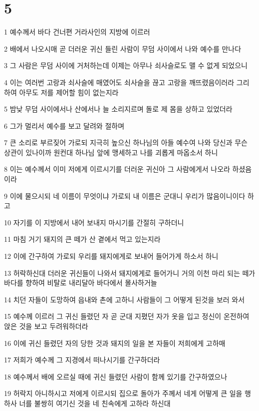 \chapter{5}

\par 1 예수께서 바다 건너편 거라사인의 지방에 이르러
\par 2 배에서 나오시매 곧 더러운 귀신 들린 사람이 무덤 사이에서 나와 예수를 만나다
\par 3 그 사람은 무덤 사이에 거처하는데 이제는 아무나 쇠사슬로도 맬 수 없게 되었으니
\par 4 이는 여러번 고랑과 쇠사슬에 매였어도 쇠사슬을 끊고 고랑을 깨뜨렸음이러라 그리하여 아무도 저를 제어할 힘이 없는지라
\par 5 밤낮 무덤 사이에서나 산에서나 늘 소리지르며 돌로 제 몸을 상하고 있었더라
\par 6 그가 멀리서 예수를 보고 달려와 절하며
\par 7 큰 소리로 부르짖어 가로되 지극히 높으신 하나님의 아들 예수여 나와 당신과 무슨 상관이 있나이까 원컨대 하나님 앞에 맹세하고 나를 괴롭게 마옵소서 하니
\par 8 이는 예수께서 이미 저에게 이르시기를 더러운 귀신아 그 사람에게서 나오라 하셨음이라
\par 9 이에 물으시되 네 이름이 무엇이냐 가로되 내 이름은 군대니 우리가 많음이니이다 하고
\par 10 자기를 이 지방에서 내어 보내지 마시기를 간절히 구하더니
\par 11 마침 거기 돼지의 큰 떼가 산 곁에서 먹고 있는지라
\par 12 이에 간구하여 가로되 우리를 돼지에게로 보내어 들어가게 하소서 하니
\par 13 허락하신대 더러운 귀신들이 나와서 돼지에게로 들어가니 거의 이천 마리 되는 떼가 바다를 향하여 비탈로 내리달아 바다에서 몰사하거늘
\par 14 치던 자들이 도망하여 읍내와 촌에 고하니 사람들이 그 어떻게 된것을 보러 와서
\par 15 예수께 이르러 그 귀신 들렸던 자 곧 군대 지폈던 자가 옷을 입고 정신이 온전하여 앉은 것을 보고 두려워하더라
\par 16 이에 귀신 들렸던 자의 당한 것과 돼지의 일을 본 자들이 저희에게 고하매
\par 17 저희가 예수께 그 지경에서 떠나시기를 간구하더라
\par 18 예수께서 배에 오르실 때에 귀신 들렸던 사람이 함께 있기를 간구하였으나
\par 19 허락지 아니하시고 저에게 이르시되 집으로 돌아가 주께서 네게 어떻게 큰 일을 행하사 너를 불쌍히 여기신 것을 네 친속에게 고하라 하신대
